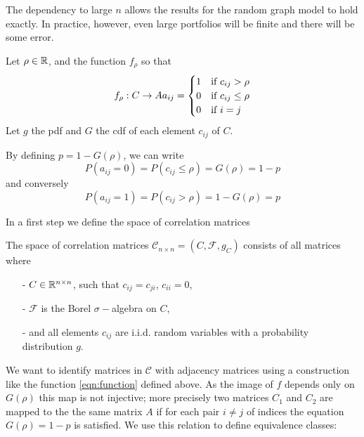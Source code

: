 \begin{remark}The dependency to large $n$ allows the results for the random graph model to hold exactly.
In practice, however, even large portfolios will be finite and there will be some error.
\end{remark}




\begin{definition}
\label{def:equivalence_aux} 
Let $\rho \in {\mathbb R}$, and the function $f_\rho$ so that
\begin{equation}
\label{eqn:function}
f_\rho: C \rightarrow A\\
\\
a_{ij} = \begin{cases} 1 & \text{if } c_{ij} > \rho \\
                       0 & \text{if } c_{ij} \le \rho \\
                       0 & \text{if } i = j
        \end{cases}
\end{equation}
Let $g$ the pdf and $G$ the cdf of each element $c_{ij}$ of $C$.

By defining $p = 1-G(\rho)$, we can write
$$
P( a_{ij} = 0 ) = P(c_{ij} \le \rho) = G(\rho) = 1-p
$$
and conversely
$$
P( a_{ij} = 1 ) = P(c_{ij} > \rho) = 1 - G(\rho) = p
$$
\end{definition}

In a first step we define the space of correlation matrices 
\begin{definition}
The space of correlation matrices $\mathcal{C}_{n\times n} = \left( C, \mathcal{F},  g_C \right)$ consists of all matrices where
\begin{itemize}
\item[-] $C \in {\mathbb R}^{n \times n}$, such that $c_{ij} = c_{ji}$, $c_{ii} = 0$, 
\item[-] $\mathcal{F}$ is the Borel $\sigma-$algebra on $C$,
\item[-] and all elements $c_{ij}$ are i.i.d. random variables with a probability distribution $g$.
\end{itemize}
\end{definition}

We want to identify matrices in $\mathcal{C}$ with adjacency matrices using a construction like the function \ref{eqn:function} defined above.
As the image of $f$ depends only on $G(\rho)$  this map is not injective; more precisely two matrices $C_1$ and $C_2$ are mapped to the the same matrix $A$ if for each pair $i\neq j$ of indices the equation  $G(\rho) = 1-p$ is satisfied.
We use this relation to define equivalence classes:

